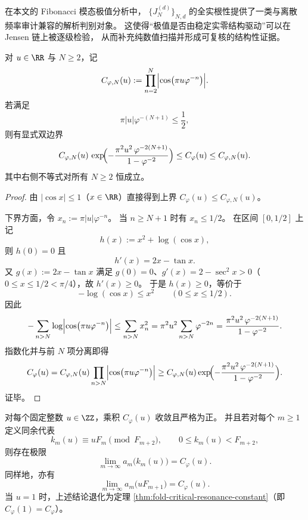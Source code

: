 \begin{remark}[从数值极值到可判别结构的桥接]\label{rem:fold-jensen-bridge-fibonacci-extrema}
在本文的 Fibonacci 模态极值分析中，
\(\{J_N^{(d)}\}_{N,d}\) 的全实根性提供了一类与离散频率审计兼容的解析判别对象。
这使得“极值是否由稳定实零结构驱动”可以在 Jensen 链上被逐级检验，
从而补充纯数值扫描并形成可复核的结构性证据。
\end{remark}



\begin{proposition}[共振梯常数的截断误差上界]\label{prop:fold-resonance-truncation-error}
对 \(u\in\RR\) 与 \(N\ge 2\)，记
\[
C_{\varphi,N}(u):=\prod_{n=2}^{N}\Bigl|\cos\bigl(\pi u\varphi^{-n}\bigr)\Bigr|.
\]
若满足
\[
\pi|u|\varphi^{-(N+1)}\le \frac12,
\]
则有显式双边界
\[
C_{\varphi,N}(u)\,
\exp\!\Bigl(
-\frac{\pi^2u^2\,\varphi^{-2(N+1)}}{1-\varphi^{-2}}
\Bigr)
\le
C_\varphi(u)
\le
C_{\varphi,N}(u).
\]
其中右侧不等式对所有 \(N\ge 2\) 恒成立。
\end{proposition}

\begin{proof}
由 \(|\cos x|\le 1\)（\(x\in\RR\)）直接得到上界
\(
C_\varphi(u)\le C_{\varphi,N}(u)
\)。

下界方面，令 \(x_n:=\pi|u|\varphi^{-n}\)。
当 \(n\ge N+1\) 时有 \(x_n\le 1/2\)。
在区间 \([0,1/2]\) 上记
\[
h(x):=x^2+\log(\cos x),
\]
则 \(h(0)=0\) 且
\[
h'(x)=2x-\tan x.
\]
又 \(g(x):=2x-\tan x\) 满足 \(g(0)=0\)、\(g'(x)=2-\sec^2x>0\)（\(0\le x\le 1/2<\pi/4\)），故 \(h'(x)\ge 0\)。
于是 \(h(x)\ge 0\)，等价于
\[
-\log(\cos x)\le x^2\qquad(0\le x\le 1/2).
\]
因此
\[
-\sum_{n>N}\log\Bigl|\cos\bigl(\pi u\varphi^{-n}\bigr)\Bigr|
\le
\sum_{n>N}x_n^2
=
\pi^2u^2\sum_{n>N}\varphi^{-2n}
=
\frac{\pi^2u^2\,\varphi^{-2(N+1)}}{1-\varphi^{-2}}.
\]
指数化并与前 \(N\) 项分离即得
\[
C_\varphi(u)
=
C_{\varphi,N}(u)\prod_{n>N}\Bigl|\cos\bigl(\pi u\varphi^{-n}\bigr)\Bigr|
\ge
C_{\varphi,N}(u)\exp\!\Bigl(
-\frac{\pi^2u^2\,\varphi^{-2(N+1)}}{1-\varphi^{-2}}
\Bigr).
\]
证毕。
\end{proof}

\begin{theorem}\label{thm:fold-critical-resonance-constant-integer-ladder}
对每个固定整数 \(u\in\ZZ\)，乘积 \(C_\varphi(u)\) 收敛且严格为正。
并且若对每个 \(m\ge 1\) 定义同余代表
\[
k_m(u)\equiv uF_m\pmod{F_{m+2}},
\qquad 0\le k_m(u)<F_{m+2},
\]
则存在极限
\[
\lim_{m\to\infty}a_m\!\bigl(k_m(u)\bigr)=C_\varphi(u).
\]
同样地，亦有
\[
\lim_{m\to\infty}a_m\!\bigl(uF_{m+1}\bigr)=C_\varphi(u).
\]
当 \(u=1\) 时，上述结论退化为定理 \ref{thm:fold-critical-resonance-constant}（即 \(C_\varphi(1)=C_\varphi\)）。
\end{theorem}

